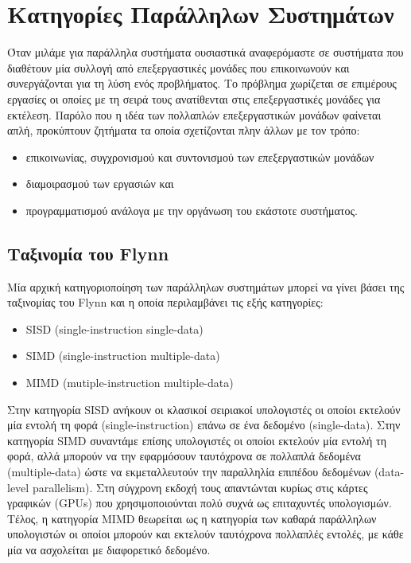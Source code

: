 \section{Κατηγορίες Παράλληλων Συστημάτων}
\label{sec:Parallel System Categories}
Όταν μιλάμε για παράλληλα συστήματα ουσιαστικά αναφερόμαστε σε συστήματα που διαθέτουν μία συλλογή από επεξεργαστικές μονάδες που επικοινωνούν και συνεργάζονται για τη λύση ενός προβλήματος. Το πρόβλημα χωρίζεται σε επιμέρους εργασίες οι οποίες με τη σειρά τους ανατίθενται στις επεξεργαστικές μονάδες για εκτέλεση. Παρόλο που η ιδέα των πολλαπλών επεξεργαστικών μονάδων φαίνεται απλή, προκύπτουν ζητήματα τα οποία σχετίζονται πλην άλλων με τον τρόπο:
\begin{itemize}
	\item επικοινωνίας, συγχρονισμού και συντονισμού των επεξεργαστικών μονάδων
	\item διαμοιρασμού των εργασιών και
	\item προγραμματισμού ανάλογα με την οργάνωση του εκάστοτε συστήματος.
\end{itemize}
 
\subsection{Ταξινομία του Flynn}
Μία αρχική κατηγοριοποίηση των παράλληλων συστημάτων μπορεί να γίνει βάσει της ταξινομίας του Flynn και η οποία περιλαμβάνει τις εξής κατηγορίες:
\begin{itemize}
	\item SISD (single-instruction single-data)
	\item SIMD (single-instruction multiple-data)
	\item MIMD (mutiple-instruction multiple-data)
\end{itemize}

Στην κατηγορία SISD ανήκουν οι κλασικοί σειριακοί υπολογιστές οι οποίοι εκτελούν μία εντολή τη φορά (single-instruction) επάνω σε ένα δεδομένο (single-data). Στην κατηγορία SIMD συναντάμε επίσης υπολογιστές οι οποίοι εκτελούν μία εντολή τη φορά, αλλά μπορούν να την εφαρμόσουν ταυτόχρονα σε πολλαπλά δεδομένα (multiple-data) ώστε να εκμεταλλευτούν την παραλληλία επιπέδου δεδομένων (data-level parallelism). Στη σύγχρονη εκδοχή τους απαντώνται κυρίως στις κάρτες γραφικών (GPUs) που χρησιμοποιούνται πολύ συχνά ως επιταχυντές υπολογισμών. Τέλος, η κατηγορία MIMD θεωρείται ως η κατηγορία των καθαρά παράλληλων υπολογιστών οι οποίοι μπορούν και εκτελούν ταυτόχρονα πολλαπλές εντολές, με κάθε μία να ασχολείται με διαφορετικό δεδομένο.

